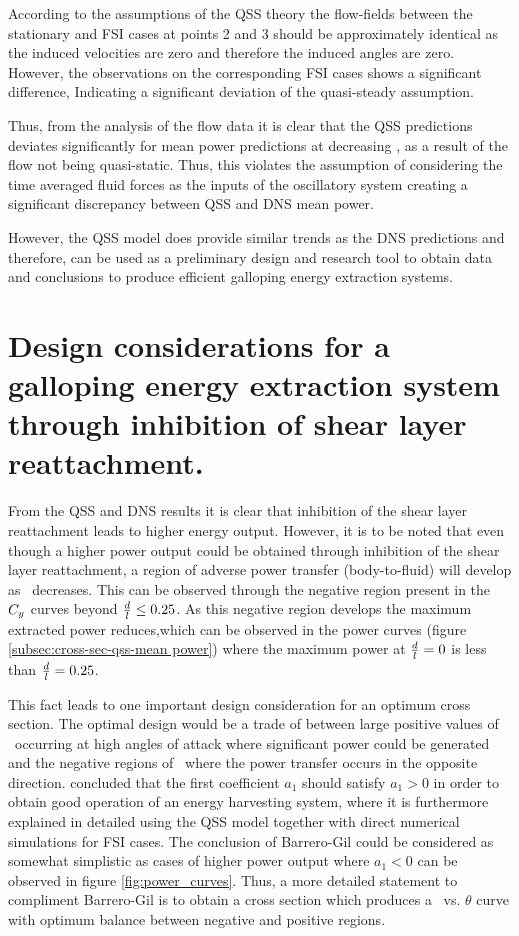 According to the assumptions of the QSS theory the flow-fields between the stationary and FSI cases at points 2 and 3 should be approximately identical as the induced velocities are zero and therefore the induced angles are zero. However, the observations on the corresponding FSI cases shows a significant difference, Indicating a significant deviation of the quasi-steady assumption.

Thus, from the analysis of the flow data it is clear that the  QSS predictions deviates significantly for mean power predictions at decreasing \ratio, as a result of the flow not being quasi-static. Thus, this violates the assumption of considering the time averaged fluid forces as the inputs of the oscillatory system creating a significant discrepancy between QSS and DNS mean power.    

 However, the QSS model does provide similar trends as the DNS predictions and therefore, can be used as a preliminary design and research tool to obtain data and conclusions to produce efficient galloping energy extraction systems. 
  
 \section{Design considerations for a galloping energy extraction system through inhibition of shear layer reattachment.}
 \label{subsec:design-considerations-cross-section}
 
 From the QSS and DNS results it is clear that inhibition of the shear layer reattachment  leads to higher energy output. However, it is to be noted that even though a higher power output could be obtained through inhibition of the shear layer reattachment, a region of adverse power transfer (body-to-fluid)  will develop as \ratio\ decreases. This can be observed through the negative region present in the $C_{y}$ curves beyond $\frac{d}{l}\leq0.25$. As this negative region develops the maximum extracted power reduces,which can be observed in the power curves (figure \ref{subsec:cross-sec-qss-mean power}) where the maximum power at $\frac{d}{l}=0$ is less than $\frac{d}{l}=0.25$.
 
 This fact leads to one important design consideration for an optimum cross section. The optimal design would be a trade of between large positive values of \cy\ occurring at high angles of attack where significant power could be generated and the negative regions of \cy\ where the power transfer occurs in the opposite direction. \citet{Barrero-Gil2010a} concluded that the first coefficient $a_1$ should satisfy  $a_1>0$ in order to obtain good operation of an energy harvesting system, where it is furthermore explained in detailed using the QSS model together with direct numerical simulations for FSI cases. The conclusion of Barrero-Gil could be considered as somewhat simplistic as cases of higher power output where $a_1 < 0$ can be observed in figure \ref{fig:power_curves}. Thus, a more detailed statement to compliment Barrero-Gil is to obtain a cross section which produces a \cy\ vs. $\theta$ curve with optimum balance between negative and positive regions.  
 
